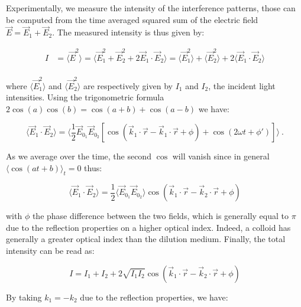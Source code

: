 Experimentally, we measure the intensity of the interference patterns, those can be computed from the time averaged squared sum of the electric field $\vec{E} = \vec{E}_1 + \vec{E}_2$. The measured intensity is thus given by:

\begin{equation}
	\begin{aligned}
		I & = \langle \vec{E}^2 \rangle = \langle \vec{E}_1^2 + \vec{E}_2^2 + 2\vec{E}_1 \cdot \vec{E}_2 \rangle 
		= \langle \vec{E}_1^2 \rangle + \langle \vec{E}_2^2 \rangle  + 2 \langle \vec{E}_1 \cdot \vec{E}_2 \rangle \\
	\end{aligned}
\end{equation} 

where $ \langle \vec{E}_1^2 \rangle $ and  $\langle \vec{E}_2^2 \rangle$ are respectively given by $I_1$ and $I_2$, the incident light intensities. Using the trigonometric formula $2 \cos (a)\cos (b) = \cos (a+b) + \cos (a-b) $ we have:

\begin{equation}
	\langle  
	\vec{E}_1 \cdot \vec{E}_2 \rangle = 
	\langle
	\frac{1}{2} \vec{E}_{0_1}  \vec{E}_{0_2} 
	\left[
		\cos 
		\left(
			\vec{k}_1 \cdot \vec{r} - \vec{k}_1 \cdot \vec{r} + \phi	
		\right)	
		+ 
		\cos
		\left(
			2\omega t + \phi'
		\right)
	\right]
	\rangle~.
\end{equation}

As we average over the time, the second $\cos$ will vanish since in general $\langle \cos(at + b) \rangle_ t = 0$ thus:

\begin{equation}
	\langle \vec{E}_1 \cdot \vec{E}_2 \rangle = \frac{1}{2} \langle  \vec{E}_{0_1}  \vec{E}_{0_2} \rangle
	\cos 
	\left(
	\vec{k}_1 \cdot \vec{r} - \vec{k}_2 \cdot \vec{r} + \phi	
	\right)	
\end{equation}

with $\phi$ the phase difference between the two fields, which is generally equal to $\pi$ due to the reflection properties on a higher optical index. Indeed, a colloid has generally a greater optical index than the dilution medium.  Finally, the total intensity can be read as:


\begin{equation}
	I = I_1 + I_2 + 2 \sqrt{I_1 I_2} 
	\cos 
	\left(
	\vec{k}_1 \cdot \vec{r} - \vec{k}_2 \cdot \vec{r} + \phi	
	\right)
\end{equation}

By taking $k_1 = - k_2$ due to the reflection properties, we have:


